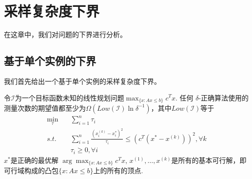 \chapter{采样复杂度下界}
\label{cha:lower}
在这章中，我们对问题的下界进行分析。
\section{基于单个实例的下界}
我们首先给出一个基于单个实例的采样复杂度下界。
 \begin{theorem}\label{inslow}
        令$\mathcal{I}$为一个目标函数未知的线性规划问题$\max_{\{x:Ax\le b\}} c^T x$. 任何 $\delta$-正确算法使用的测量次数的期望值都至少为$\Omega(Low(\mathcal{I}) \ln \delta^{-1})$，其中$Low(\mathcal{I})$等于
		\begin{align*}
         \min_\tau \quad & \sum_{i=1}^n \tau_i\\
        s.t.\quad & \sum_{i=1}^n \frac{(x_i^{(k)} -x_i^*)^2}{\tau_i} \le \left( c^T (x^* - x^{(k)}) \right)^2, \forall k\\
         &\tau_i\ge 0, \forall i
        \end{align*}
$x^*$是正确的最优解 $\arg \max_{\{x:Ax\le b\}} c^T x$, $x^{(1)},\dots, x^{(k)}$是所有的基本可行解，即可行域构成的凸包$\{x:Ax\le b\}$上的所有的顶点.
\end{theorem}
